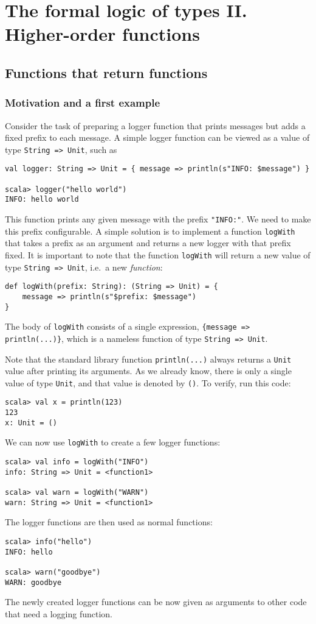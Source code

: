 
\chapter{The formal logic of types II. Higher-order functions\label{chap:Higher-order-functions} }

\section{Functions that return functions}

\subsection{Motivation and a first example}

Consider the task of preparing a logger function that prints messages
but adds a fixed prefix to each message. A simple logger function
can be viewed as a value of type \lstinline!String => Unit!, such
as
\begin{lstlisting}
val logger: String => Unit = { message => println(s"INFO: $message") }

scala> logger("hello world")
INFO: hello world
\end{lstlisting}
This function prints any given message with the prefix \lstinline!"INFO:"!.
We need to make this prefix configurable. A simple solution is to
implement a function \lstinline!logWith! that takes a prefix as an
argument and returns a new logger with that prefix fixed. It is important
to note that the function \lstinline!logWith! will return a new value
of type \lstinline!String => Unit!, i.e.~a new \emph{function}:
\begin{lstlisting}
def logWith(prefix: String): (String => Unit) = {
    message => println(s"$prefix: $message")
}
\end{lstlisting}
The body of \lstinline!logWith! consists of a single expression,
\lstinline!{message => println(...)}!, which is a nameless function
of type \lstinline!String => Unit!. 

Note that the standard library function \lstinline!println(...)!
always returns a \lstinline!Unit! value after printing its arguments.
As we already know, there is only a single value of type \lstinline!Unit!,
and that value is denoted by \lstinline!()!. To verify, run this
code:
\begin{lstlisting}
scala> val x = println(123)
123
x: Unit = ()
\end{lstlisting}

We can now use \lstinline!logWith! to create a few logger functions:
\begin{lstlisting}
scala> val info = logWith("INFO")
info: String => Unit = <function1>

scala> val warn = logWith("WARN")
warn: String => Unit = <function1>
\end{lstlisting}
The logger functions are then used as normal functions:
\begin{lstlisting}
scala> info("hello")
INFO: hello

scala> warn("goodbye")
WARN: goodbye
\end{lstlisting}
The newly created logger functions can be now given as arguments to
other code that need a logging function.

